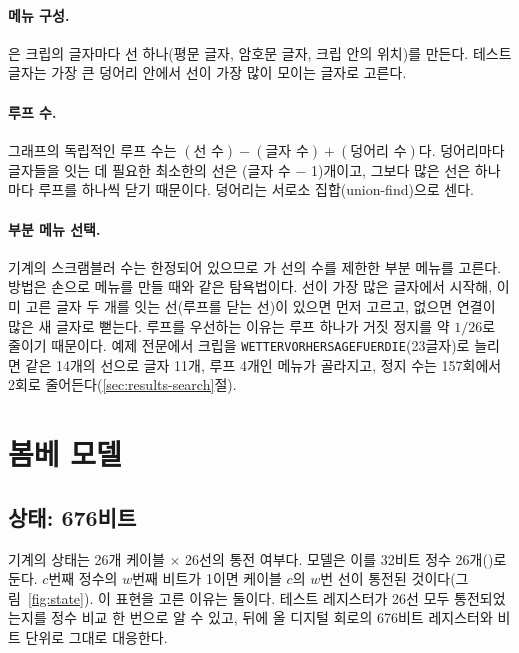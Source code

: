 \paragraph{메뉴 구성.} 은 크립의 글자마다 선 하나(평문 글자, 암호문 글자, 크립 안의
위치)를 만든다. 테스트 글자는 가장 큰 덩어리 안에서 선이 가장 많이 모이는 글자로 고른다.

\paragraph{루프 수.} 그래프의 독립적인 루프 수는 $(\text{선 수}) - (\text{글자 수}) + (\text{덩어리 수})$다.
덩어리마다 글자들을 잇는 데 필요한 최소한의 선은 (글자 수 $-$ 1)개이고, 그보다 많은 선은 하나마다 루프를
하나씩 닫기 때문이다. 덩어리는 서로소 집합(union-find)으로 센다.

\paragraph{부분 메뉴 선택.} 기계의 스크램블러 수는 한정되어 있으므로 가 선의 수를
제한한 부분 메뉴를 고른다. 방법은 손으로 메뉴를 만들 때와 같은 탐욕법이다. 선이 가장 많은 글자에서
시작해, 이미 고른 글자 두 개를 잇는 선(루프를 닫는 선)이 있으면 먼저 고르고, 없으면 연결이 많은 새
글자로 뻗는다. 루프를 우선하는 이유는 루프 하나가 거짓 정지를 약 $1/26$로 줄이기 때문이다.
예제 전문에서 크립을 \texttt{WETTERVORHERSAGEFUERDIE}(23글자)로 늘리면 같은 14개의 선으로 글자 11개,
루프 4개인 메뉴가 골라지고, 정지 수는 157회에서 2회로 줄어든다(\ref{sec:results-search}절).

\section{봄베 모델}

\subsection{상태: 676비트}

기계의 상태는 26개 케이블 × 26선의 통전 여부다. 모델은 이를 32비트 정수 26개(\code{[u32; 26]})로
둔다. $c$번째 정수의 $w$번째 비트가 1이면 케이블 $c$의 $w$번 선이 통전된 것이다(그림~\ref{fig:state}).
이 표현을 고른 이유는 둘이다. 테스트 레지스터가 26선 모두 통전되었는지를 정수 비교 한 번으로 알 수
있고, 뒤에 올 디지털 회로의 676비트 레지스터와 비트 단위로 그대로 대응한다.

